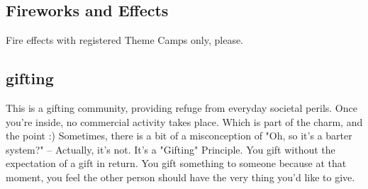 



\subsection*{Fireworks and Effects}
Fire effects with registered Theme Camps only, please.

\subsection*{\Gls{gifting}}\label{gifting}
This is a gifting community, providing refuge from everyday societal perils.  Once you're inside, no commercial activity takes place. Which is part of the charm, and the point :) 
Sometimes, there is a bit of a misconception of "Oh, so it's a barter system?" -- Actually, it's not. It's a "Gifting" Principle.
You gift without the expectation of a gift in return. 
You gift something to someone because at that moment, you feel the other person should have the very thing you'd like to give.



